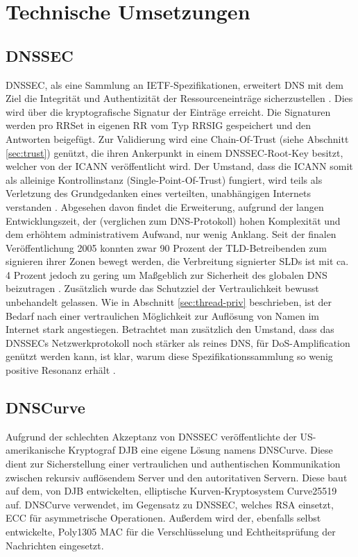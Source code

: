 \chapter{Technische Umsetzungen}
\label{chap:technologies}

\section{DNSSEC}
\label{sec:tec-dnssec}
DNSSEC, als eine Sammlung an IETF-Spezifikationen, erweitert DNS mit dem Ziel die Integrität und Authentizität der Ressourceneinträge sicherzustellen \cite{Arends2005}. Dies wird über die kryptografische Signatur der Einträge erreicht. Die Signaturen werden pro RRSet in eigenen RR vom Typ RRSIG gespeichert und den Antworten beigefügt. Zur Validierung wird eine Chain-Of-Trust (siehe Abschnitt \ref{sec:trust}) genützt, die ihren Ankerpunkt in einem \ac{DNSSEC}-Root-Key besitzt, welcher von der ICANN veröffentlicht wird. Der Umstand, dass die ICANN somit als alleinige Kontrollinstanz (Single-Point-Of-Trust) fungiert, wird teils als Verletzung des Grundgedanken eines verteilten, unabhängigen Internets verstanden \cite{Finch2014}.
Abgesehen davon findet die Erweiterung, aufgrund der langen Entwicklungszeit, der (verglichen zum DNS-Protokoll) hohen Komplexität und dem erhöhtem administrativem Aufwand, nur wenig Anklang. Seit der finalen Veröffentlichung 2005 konnten zwar 90 Prozent der TLD-Betreibenden zum signieren ihrer Zonen bewegt werden, die Verbreitung signierter SLDs ist mit ca. 4 Prozent jedoch zu gering um Maßgeblich zur Sicherheit des globalen DNS beizutragen \cite{DCCommunications2018}. Zusätzlich wurde das Schutzziel der Vertraulichkeit bewusst unbehandelt gelassen. Wie in Abschnitt \ref{sec:thread-priv} beschrieben, ist der Bedarf nach einer vertraulichen Möglichkeit zur Auflösung von Namen im Internet stark angestiegen. Betrachtet man zusätzlich den Umstand, dass das \ac{DNSSEC}s Netzwerkprotokoll noch stärker als reines DNS, für \ac{DoS}-Amplification genützt werden kann, ist klar, warum diese Spezifikationssammlung so wenig positive Resonanz erhält \cite{Antic2014}.

\section{DNSCurve}
\label{sec:tec-dnscurve}
Aufgrund der schlechten Akzeptanz von \ac{DNSSEC} veröffentlichte der US-amerikanische Kryptograf \ac{DJB} eine eigene Lösung namens DNSCurve. Diese dient zur Sicherstellung einer vertraulichen und authentischen Kommunikation zwischen rekursiv auflösendem Server und den autoritativen Servern. Diese baut auf dem, von \ac{DJB} entwickelten, elliptische Kurven-Kryptosystem Curve25519 auf. DNSCurve verwendet, im Gegensatz zu \ac{DNSSEC}, welches RSA einsetzt, \ac{ECC} für asymmetrische Operationen. Außerdem wird der, ebenfalls selbst entwickelte, Poly1305 \ac{MAC} für die Verschlüsselung und Echtheitsprüfung der Nachrichten eingesetzt. 

